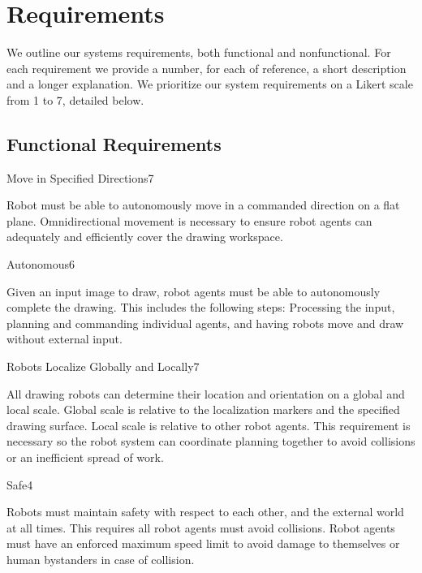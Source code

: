 
\section{Requirements}
\label{sec:requirements}
We outline our systems requirements, both functional and nonfunctional. For each requirement we provide a number, for each of reference, a short description and a longer explanation. We prioritize our system requirements on a Likert scale from 1 to 7, detailed below. 


\subsection{Functional Requirements}
\label{sec:functional_requirements}

\begin{functional_requirement}{Move in Specified Directions}{7}
\item Robot must be able to autonomously move in a commanded direction on a flat plane. Omnidirectional movement is necessary to ensure robot agents can adequately and efficiently cover the drawing workspace.
\end{functional_requirement}

\begin{functional_requirement}{Autonomous}{6}
\item Given an input image to draw, robot agents must be able to autonomously complete the drawing. This includes the following steps: Processing the input, planning and commanding individual agents, and having robots move and draw without external input.
\end{functional_requirement}

\begin{functional_requirement}{Robots Localize Globally and Locally}{7}
\item All drawing robots can determine their location and orientation on a global and local scale. Global scale is relative to the localization markers and the specified drawing surface. Local scale is relative to other robot agents. This requirement is necessary so the robot system can coordinate planning together to avoid collisions or an inefficient spread of work.
\end{functional_requirement}

\begin{functional_requirement}{Safe}{4}
\item Robots must maintain safety with respect to each other, and the external world at all times. This requires all robot agents must avoid collisions. Robot agents must have an enforced maximum speed limit to avoid damage to themselves or human bystanders in case of collision.
\end{functional_requirement}

